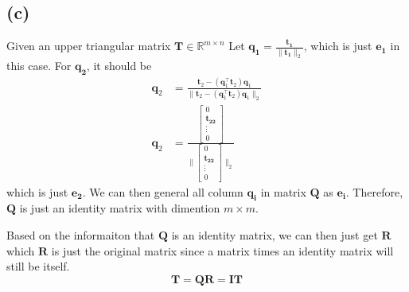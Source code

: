 \documentclass{article}
\newcommand{\bmat}[1]{\begin{bmatrix} #1 \end{bmatrix}}
\newcommand{\mat}[1]{\mathbf{#1}}
\begin{document}
\subsection*{(c)}
Given an upper triangular matrix $\mat{T} \in \mathbb{R}^{m \times n}$
Let $\mat{q_1} = \frac{\mat{t_1}}{\|\mat{t_1}\|_2}$, which is just $\mat{e_1}$ in this case. For $\mat{q_2}$, it should be
\begin{align}
    \mat{q}_2 &= \frac{\mat{t}_2-(\mat{q}_1^\top\mat{t}_2)\mat{q}_1}{\|\mat{t}_2-(\mat{q}_1^\top\mat{t}_2)\mat{q}_1\|_2} \nonumber \\
    \mat{q}_2 &= \frac{\bmat{0 \\ \mat{t_22} \\ \vdots \\ 0}}{\|\bmat{0 \\ \mat{t_22} \\ \vdots \\ 0}\|_2} \nonumber 
\end{align}
which is just $\mat{e_2}$. We can then general all column $\mat{q_i}$ in matrix $\mat{Q}$ as $\mat{e_i}$. Therefore, $\mat{Q}$ is just an
identity matrix with dimention $m \times m$.

Based on the informaiton that $\mat{Q}$ is an identity matrix, we can then just get $\mat{R}$ which $\mat{R}$ is just 
the original matrix since a matrix times an identity matrix will still be itself.
$$\mat{T} = \mat{Q}\mat{R} = \mat{I}\mat{T}$$
\end{document}
